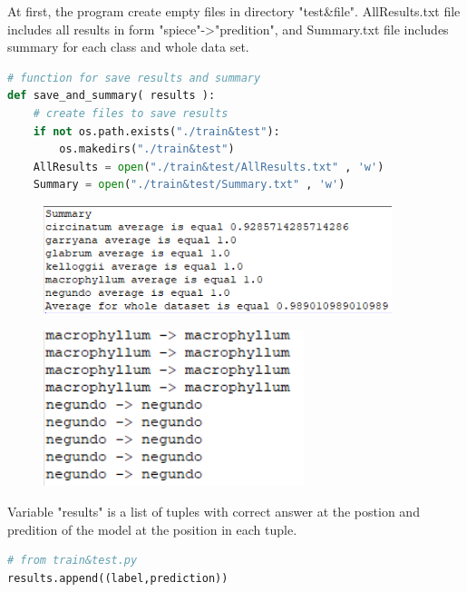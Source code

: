 \documentclass[12pt]{article}
\begin{document}
At first, the program create empty files in directory "test\&file". AllResults.txt file includes all results in form "spiece"->"predition", and
Summary.txt file includes summary for each class and whole data set.

\begin{lstlisting}[language=Python]
# function for save results and summary
def save_and_summary( results ):
    # create files to save results
    if not os.path.exists("./train&test"):
        os.makedirs("./train&test")
    AllResults = open("./train&test/AllResults.txt" , 'w')     
    Summary = open("./train&test/Summary.txt" , 'w') 
\end{lstlisting} 

\begin{center}
\begin{figure}[h!]
\centering
\includegraphics[width = 4in]{summary_sample.png}
\end{figure}
\end{center}

\begin{center}
\begin{figure}[h!]
\centering
\includegraphics[width =3in]{allresults_sample.png}
\end{figure}
\end{center}

Variable "results" is a list of tuples with correct answer at the  postion and predition of the model at the  position in each tuple.

\begin{lstlisting}[language=Python]
# from train&test.py
results.append((label,prediction))
\end{lstlisting} 
\end{document}
